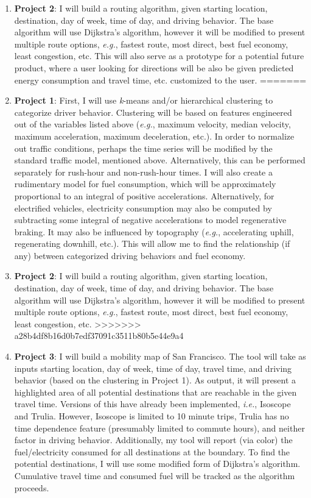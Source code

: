 \documentclass[12pt]{article}
\begin{document}
\begin{enumerate}
\item \textbf{Project 2}: I will build a routing algorithm, given starting location, destination, day of week, time of day, and driving behavior. The base algorithm will use Dijkstra's algorithm, however it will be modified to present multiple route options, \textit{e.g.}, fastest route, most direct, best fuel economy, least congestion, etc. This will also serve as a prototype for a potential future product, where a user looking for directions will be also be given predicted energy consumption and travel time, etc. customized to the user.
=======
\item \textbf{Project 1}: First, I will use \textit{k}-means and/or hierarchical clustering to categorize driver behavior. Clustering will be based on features engineered out of the variables listed above (\textit{e.g.}, maximum velocity, median velocity, maximum acceleration, maximum deceleration, etc.). In order to normalize out traffic conditions, perhaps the time series will be modified by the standard traffic model, mentioned above. Alternatively, this can be performed separately for rush-hour and non-rush-hour times. I will also create a rudimentary model for fuel consumption, which will be approximately proportional to an integral of positive accelerations. Alternatively, for electrified vehicles, electricity consumption may also be computed by subtracting some integral of negative accelerations to model regenerative braking. It may also be influenced by topography (\textit{e.g.}, accelerating uphill, regenerating downhill, etc.). This will allow me to find the relationship (if any) between categorized driving behaviors and fuel economy.

\item \textbf{Project 2}: I will build a routing algorithm, given starting location, destination, day of week, time of day, and driving behavior. The base algorithm will use Dijkstra's algorithm, however it will be modified to present multiple route options, \textit{e.g.}, fastest route, most direct, best fuel economy, least congestion, etc.
>>>>>>> a28b4df8b16d0b7edf37091c3511b80b5e44e9a4

\item \textbf{Project 3}: I will build a mobility map of San Francisco. The tool will take as inputs starting location, day of week, time of day, travel time, and driving behavior (based on the clustering in Project 1). As output, it will present a highlighted area of all potential destinations that are reachable in the given travel time. Versions of this have already been implemented, \textit{i.e.}, Isoscope and Trulia. However, Isoscope is limited to 10 minute trips, Trulia has no time dependence feature (presumably limited to commute hours), and neither factor in driving behavior. Additionally, my tool will report (via color) the fuel/electricity consumed for all destinations at the boundary. To find the potential destinations, I will use some modified form of Dijkstra's algorithm. Cumulative travel time and consumed fuel will be tracked as the algorithm proceeds.

\end{enumerate}
\end{document}
